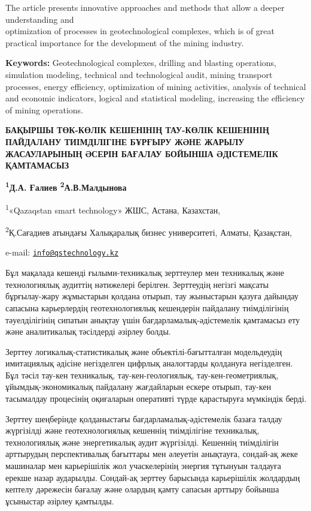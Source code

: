 The article presents innovative approaches and methods that allow a
deeper understanding and \\optimization of processes in geotechnological
complexes, which is of great practical importance for the development of
the mining industry.

{\bfseries Keywords:} Geotechnological complexes, drilling and blasting
operations, simulation modeling, technical and technological audit,
mining transport processes, energy efficiency, optimization of mining
activities, analysis of technical and economic indicators, logical and
statistical modeling, increasing the efficiency of mining operations.

\begin{articleheader}
{\bfseries БАҚЫРШЫ ТӨК-КӨЛІК КЕШЕНІНІҢ ТАУ-КӨЛІК КЕШЕНІНІҢ ПАЙДАЛАНУ
ТИІМДІЛІГІНЕ БҰРҒЫРУ ЖӘНЕ ЖАРЫЛУ ЖАСАУЛАРЫНЫҢ ӘСЕРІН БАҒАЛАУ БОЙЫНША
ӘДІСТЕМЕЛІК ҚАМТАМАСЫЗ}

{\bfseries
\textsuperscript{1}Д.А. Ғалиев\textsuperscript{\envelope }
\textsuperscript{2}А.В.Малдынова
}
\end{articleheader}

\begin{affiliation}
\textsuperscript{1}«Qazaqstan smart technology» ЖШС, Астана, Казахстан,

\textsuperscript{2}Қ.Сағадиев атындағы Халықаралық бизнес университеті, Алматы, Қазақстан,

e-mail: \href{mailto:info@qstechnology.kz}{\nolinkurl{info@qstechnology.kz}}
\end{affiliation}

Бұл мақалада кешенді ғылыми-техникалық зерттеулер мен техникалық және
технологиялық аудиттің нәтижелері берілген. Зерттеудің негізгі мақсаты
бұрғылау-жару жұмыстарын қолдана отырып, тау жыныстарын қазуға дайындау
сапасына карьерлердің геотехнологиялық кешендерін пайдалану
тиімділігінің тәуелділігінің сипатын анықтау үшін
бағдарламалық-әдістемелік қамтамасыз ету және аналитикалық тәсілдерді
әзірлеу болды.

Зерттеу логикалық-статистикалық және объектілі-бағытталған модельдеудің
имитациялық әдісіне негізделген цифрлық аналогтарды қолдануға
негізделген. Бұл тәсіл тау-кен техникалық, тау-кен-геологиялық,
тау-кен-геометриялық, ұйымдық-экономикалық пайдалану жағдайларын ескере
отырып, тау-кен тасымалдау процесінің оқиғаларын оперативті түрде
қарастыруға мүмкіндік берді.

Зерттеу шеңберінде қолданыстағы бағдарламалық-әдістемелік базаға талдау
жүргізілді және геотехнологиялық кешеннің тиімділігіне техникалық,
технологиялық және энергетикалық аудит жүргізілді. Кешеннің тиімділігін
арттырудың перспективалық бағыттары мен әлеуетін анықтауға, сондай-ақ
жеке машиналар мен карьерішілік жол учаскелерінің энергия тұтынуын
талдауға ерекше назар аударылды. Сондай-ақ зерттеу барысында
карьерішілік жолдардың кептелу дәрежесін бағалау және олардың қамту
сапасын арттыру бойынша ұсыныстар әзірлеу қамтылды.


